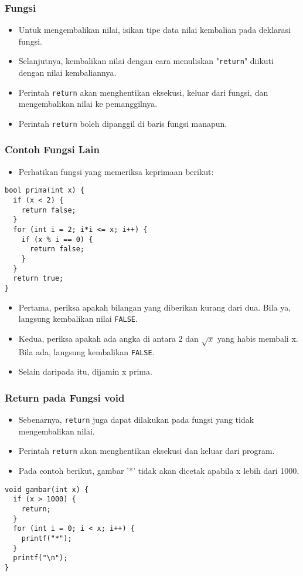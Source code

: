 \begin{frame}[fragile]
\frametitle{Fungsi}
\begin{itemize}
  \item Untuk mengembalikan nilai, isikan tipe data nilai kembalian pada deklarasi fungsi.
  \item Selanjutnya, kembalikan nilai dengan cara menuliskan "\texttt{return}" diikuti dengan nilai kembaliannya.
  \item Perintah \texttt{return} akan menghentikan eksekusi, keluar dari fungsi, dan mengembalikan nilai ke pemanggilnya.
  \item Perintah \texttt{return} boleh dipanggil di baris fungsi manapun.
\end{itemize}
\end{frame}

\begin{frame}[fragile]
\frametitle{Contoh Fungsi Lain}
\begin{itemize}
  \item Perhatikan fungsi yang memeriksa keprimaan berikut:
\end{itemize}
\begin{lstlisting}
bool prima(int x) {
  if (x < 2) {
    return false;
  }
  for (int i = 2; i*i <= x; i++) {
    if (x % i == 0) {
      return false;
    }
  }
  return true;
}
\end{lstlisting}
\begin{itemize}
  \item Pertama, periksa apakah bilangan yang diberikan kurang dari dua. Bila ya, langsung kembalikan nilai \texttt{FALSE}.
  \item Kedua, periksa apakah ada angka di antara 2 dan $\sqrt{x}$ yang habis membali x. Bila ada, langsung kembalikan \texttt{FALSE}.
  \item Selain daripada itu, dijamin x prima.
\end{itemize}
\end{frame}

\begin{frame}[fragile]
\frametitle{Return pada Fungsi void}
\begin{itemize}
  \item Sebenarnya, \texttt{return} juga dapat dilakukan pada fungsi yang tidak mengembalikan nilai.
  \item Perintah \texttt{return} akan menghentikan eksekusi dan keluar dari program.  
  \item Pada contoh berikut, gambar '*' tidak akan dicetak apabila x lebih dari 1000.
\end{itemize}
\begin{lstlisting}
void gambar(int x) {
  if (x > 1000) {
    return;
  }
  for (int i = 0; i < x; i++) {
    printf("*");
  }
  printf("\n");
}
\end{lstlisting}
\end{frame}

